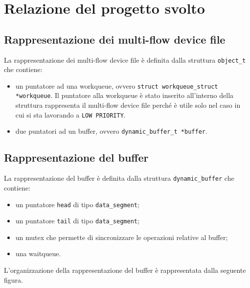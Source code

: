 \documentclass[oneside]{article}
\begin{document}
\section{Relazione del progetto svolto}
\subsection{Rappresentazione dei multi-flow device file}
La rappresentazione dei multi-flow device file è definita dalla struttura \texttt{object\_t} che contiene:
\begin{itemize}
\item un puntatore ad una workqueue, ovvero \texttt{struct workqueue\_struct *workqueue}. Il puntatore alla workqueue è stato inserito all'interno della struttura rappresenta il multi-flow device file perché è utile solo nel caso in cui si sta lavorando a \texttt{LOW PRIORITY}.
\item due puntatori ad un buffer, ovvero \texttt{dynamic\_buffer\_t *buffer}.
\end{itemize}

\subsection{Rappresentazione del buffer}
La rappresentazione del buffer è definita dalla struttura \texttt{dynamic\_buffer} che contiene:
\begin{itemize}
\item un puntatore \texttt{head} di tipo \texttt{data\_segment};
\item un puntatore \texttt{tail} di tipo \texttt{data\_segment};
\item un mutex che permette di sincronizzare le operazioni relative al buffer;
\item una waitqueue.
\end{itemize}

L'organizzazione della rappresentazione del buffer è rappresentata dalla seguente figura.

\begin{figure}[ht!]
\centering
{}
\end{figure}
\end{document}
